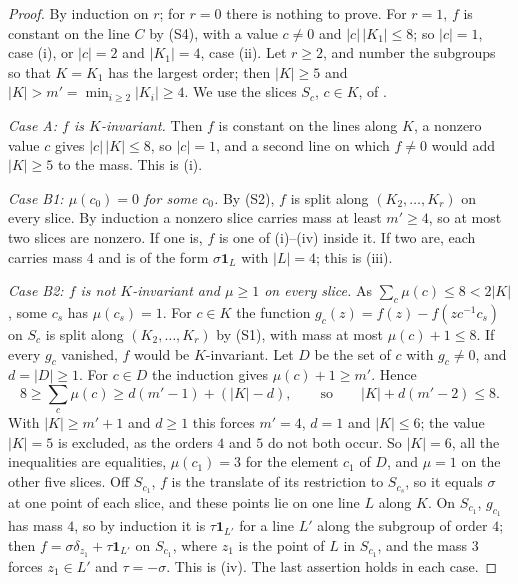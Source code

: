 \begin{proof}
By induction on $r$; for $r=0$ there is nothing to prove. For $r=1$, $f$ is
constant on the line $C$ by (S4), with a value $c\ne0$ and $|c|\,|K_{1}|\le8$;
so $|c|=1$, case (i), or $|c|=2$ and $|K_{1}|=4$, case (ii). Let $r\ge2$, and
number the subgroups so that $K=K_{1}$ has the largest order; then $|K|\ge5$
and $|K|>m'=\min_{i\ge2}|K_{i}|\ge4$. We use the slices $S_{c}$, $c\in K$, of
.

\emph{Case A: $f$ is $K$-invariant.} Then $f$ is constant on the lines along
$K$, a nonzero value $c$ gives $|c|\,|K|\le8$, so $|c|=1$, and a second
line on which $f\ne0$ would add $|K|\ge5$ to the mass. This is (i).

\emph{Case B1: $\mu(c_{0})=0$ for some $c_{0}$.} By (S2), $f$ is split along
$(K_{2},\dots,K_{r})$ on every slice. By induction a nonzero slice carries
mass at least $m'\ge4$, so at most two slices are nonzero. If one is, $f$ is
one of (i)--(iv) inside it. If two are, each carries mass $4$ and is of the
form $\sigma\mathbf 1_{L}$ with $|L|=4$; this is (iii).

\emph{Case B2: $f$ is not $K$-invariant and $\mu\ge1$ on every slice.} As
$\sum_{c}\mu(c)\le8<2|K|$, some $c_{s}$ has $\mu(c_{s})=1$. For $c\in K$ the
function $g_{c}(z)=f(z)-f(zc^{-1}c_{s})$ on $S_{c}$ is split along
$(K_{2},\dots,K_{r})$ by (S1), with mass at most $\mu(c)+1\le8$. If every
$g_{c}$ vanished, $f$ would be $K$-invariant. Let $D$ be the set of $c$ with
$g_{c}\ne0$, and $d=|D|\ge1$. For $c\in D$ the induction gives $\mu(c)+1\ge
m'$. Hence
\[
  8\ge\sum_{c}\mu(c)\ge d(m'-1)+(|K|-d),\qquad\text{so}\qquad |K|+d(m'-2)\le8.
\]
With $|K|\ge m'+1$ and $d\ge1$ this forces $m'=4$, $d=1$ and $|K|\le6$; the
value $|K|=5$ is excluded, as the orders $4$ and $5$ do not both occur. So
$|K|=6$, all the inequalities are equalities, $\mu(c_{1})=3$ for the element
$c_{1}$ of $D$, and $\mu=1$ on the other five slices. Off $S_{c_{1}}$, $f$ is
the translate of its restriction to $S_{c_{s}}$, so it equals $\sigma$ at one
point of each slice, and these points lie on one line $L$ along $K$. On
$S_{c_{1}}$, $g_{c_{1}}$ has mass $4$, so by induction it is $\tau\mathbf
1_{L'}$ for a line $L'$ along the subgroup of order $4$; then $f=\sigma\delta_{z_{1}}
+\tau\mathbf 1_{L'}$ on $S_{c_{1}}$, where $z_{1}$ is the point of $L$ in
$S_{c_{1}}$, and the mass $3$ forces $z_{1}\in L'$ and $\tau=-\sigma$. This
is (iv). The last assertion holds in each case.
\end{proof}

